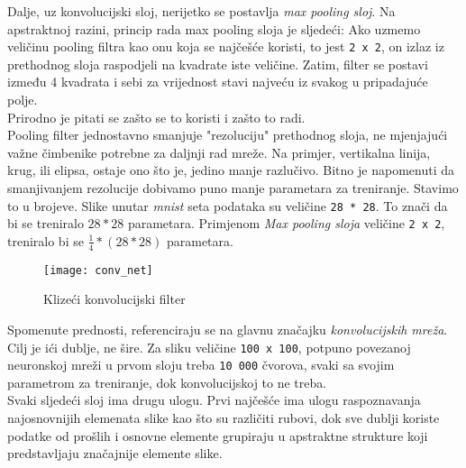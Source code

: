 Dalje, uz konvolucijski sloj, nerijetko se postavlja \emph{max pooling sloj}. Na apstraktnoj razini, princip rada max pooling sloja je sljedeći: Ako uzmemo veličinu pooling filtra kao onu koja se najčešće koristi, to jest \texttt{2 x 2}, on izlaz iz prethodnog sloja raspodjeli na kvadrate iste veličine. Zatim, filter se postavi između 4 kvadrata i sebi za vrijednost stavi najveću iz svakog u pripadajuće polje. \\ 
Prirodno je pitati se zašto se to koristi i zašto to radi. \\
Pooling filter jednostavno smanjuje "rezoluciju" prethodnog sloja, ne mjenjajući važne čimbenike potrebne za daljnji rad mreže. Na primjer, vertikalna linija, krug, ili elipsa, ostaje ono što je, jedino manje razlučivo. 
Bitno je napomenuti da smanjivanjem rezolucije dobivamo puno manje parametara za treniranje. 
Stavimo to u brojeve. Slike unutar \emph{mnist} seta podataka su veličine \texttt{28 * 28}. To znači da bi se treniralo $28*28$ parametara. Primjenom \emph{Max pooling sloja} veličine \texttt{2 x 2}, treniralo bi se $\frac{1}{4}*(28*28)$ parametara. 

\begin{figure}[h!]
	\centering
	\texttt{[image: conv\_net]}
	 \caption{Klizeći konvolucijski filter}
 	 \label{fig:conv_net_1}
\end{figure}

Spomenute prednosti, referenciraju se na glavnu značajku \emph{konvolucijskih mreža}. Cilj je ići dublje, ne šire. Za sliku veličine \texttt{100 x 100}, potpuno povezanoj neuronskoj mreži u prvom sloju treba \texttt{10 000} čvorova, svaki sa svojim parametrom za treniranje, dok konvolucijskoj to ne treba. \\
Svaki sljedeći sloj ima drugu ulogu. Prvi najčešće ima ulogu raspoznavanja najosnovnijih elemenata slike kao što su različiti rubovi, dok sve dublji koriste podatke od prošlih i osnovne elemente grupiraju u apstraktne strukture koji predstavljaju značajnije elemente slike.
